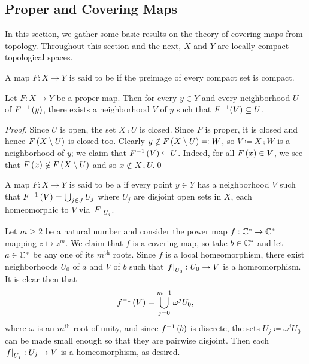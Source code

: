 \documentclass[../Moduli_Spaces_of_Riemann_Surfaces.tex]{subfiles}
\begin{document}
    \subsection{Proper and Covering Maps}
    In this section, we gather some basic results on the theory of covering maps from topology. Throughout this section and the next, $X$ and $Y$ are locally-compact topological spaces.
    \begin{definition}
        A map $F:X\to Y$ is said to be  if the preimage of every compact set is compact.
    \end{definition}
    \begin{proposition}\label{1.3:prp:proper_give_neighborhoods}
        Let $F:X\to Y$ be a proper map. Then for every $y\in Y$ and every neighborhood $U$ of $F^{-1}\left(y\right)$, there exists a neighborhood $V$ of $y$ such that $F^{-1}\!\left(V\right)\subseteq U$.
    \end{proposition}
    \begin{proof}
        Since $U$ is open, the set $X\comp U$ is closed. Since $F$ is proper, it is closed and hence $F\left(X\setminus U\right)$ is closed too. Clearly $y\not\in F\left(X\setminus U\right)\eqqcolon W$, so $V\coloneqq X\comp W$ is a neighborhood of $y$; we claim that $F^{-1}\left(V\right)\subseteq U$. Indeed, for all $F\left(x\right)\in V$, we see that $F\left(x\right)\not\in F\left(X\setminus U\right)$ and so $x\not\in X\comp U$.\qed
    \end{proof}
    \begin{definition}
        A map $F:X\to Y$ is said to be a  if every point $y\in Y$ has a neighborhood $V$ such that $F^{-1}\left(V\right)=\bigcup_{j\in J}U_j$ where $U_j$ are disjoint open sets in $X$, each homeomorphic to $V$ via $\left.F\right|_{U_j}$.
    \end{definition}
    \begin{example}
        Let $m\geq2$ be a natural number and consider the power map $f:\mathbb{C}^\ast\to\mathbb{C}^\ast$ mapping $z\mapsto z^m$. We claim that $f$ is a covering map, so take $b\in\mathbb{C}^\ast$ and let $a\in\mathbb{C}^\ast$ be any one of its $m^\textrm{th}$ roots. Since $f$ is a local homeomorphism, there exist neighborhoods $U_0$ of $a$ and $V$ of $b$ such that $\left.f\right|_{U_0}:U_0\to V$ is a homeomorphism. It is clear then that
        \vspace{-0.05in}
        \begin{equation*}
            f^{-1}\left(V\right)=\bigcup_{j=0}^{m-1}\omega^jU_0,
        \end{equation*}
        where $\omega$ is an $m^\textrm{th}$ root of unity, and since $f^{-1}\left(b\right)$ is discrete, the sets $U_j\coloneqq\omega^jU_0$ can be made small enough so that they are pairwise disjoint. Then each $\left.f\right|_{U_j}:U_j\to V$ is a homeomorphism, as desired.\exqed
    \end{example}
\end{document}
